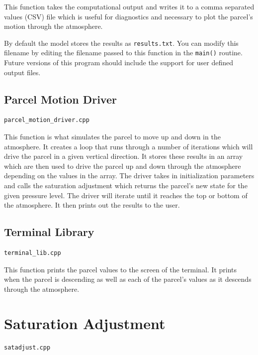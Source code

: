 \documentclass{article}
\begin{document}
This function takes the computational output and writes it to a comma separated values (CSV) file which is useful for diagnostics and necessary to plot the parcel's motion through the atmosphere. 

By default the model stores the results as \texttt{results.txt}. You can modify this filename by editing the filename passed to this function in the \texttt{main()} routine. Future versions of this program should include the support for user defined output files.


\subsection{Parcel Motion Driver}
\begin{verbatim}
parcel_motion_driver.cpp
\end{verbatim}

This function is what simulates the parcel to move up and down in the atmosphere. It creates a loop that runs through a number of iterations which will drive the parcel in a given vertical direction. It stores these results in an array which are then used to drive the parcel up and down through the atmosphere depending on the values in the array. The driver takes in initialization parameters and calls the saturation adjustment which returns the parcel's new state for the given pressure level. The driver will iterate until it reaches the top or bottom of the atmosphere. It then prints out the results to the user.


\subsection{Terminal Library}
\begin{verbatim}
terminal_lib.cpp
\end{verbatim}

This function prints the parcel values to the screen of the terminal. It prints when the parcel is descending as well as each of the parcel's values as it descends through the atmosphere. 



\section{Saturation Adjustment}\label{satadjust}
\begin{verbatim}
satadjust.cpp
\end{verbatim}
\end{document}
